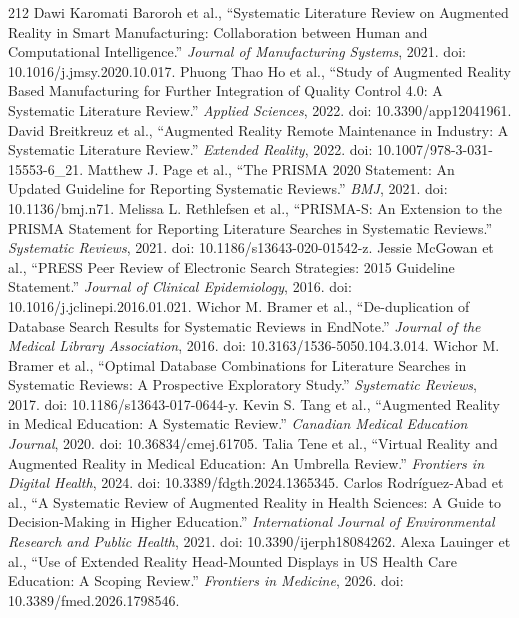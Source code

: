 \begin{thebibliography}{212}
 Dawi Karomati Baroroh et al., ``Systematic Literature Review on Augmented Reality in Smart Manufacturing: Collaboration between Human and Computational Intelligence.'' \emph{Journal of Manufacturing Systems}, 2021. doi: 10.1016/j.jmsy.2020.10.017.
 Phuong Thao Ho et al., ``Study of Augmented Reality Based Manufacturing for Further Integration of Quality Control 4.0: A Systematic Literature Review.'' \emph{Applied Sciences}, 2022. doi: 10.3390/app12041961.
 David Breitkreuz et al., ``Augmented Reality Remote Maintenance in Industry: A Systematic Literature Review.'' \emph{Extended Reality}, 2022. doi: 10.1007/978-3-031-15553-6_21.
 Matthew J. Page et al., ``The {PRISMA} 2020 Statement: An Updated Guideline for Reporting Systematic Reviews.'' \emph{BMJ}, 2021. doi: 10.1136/bmj.n71.
 Melissa L. Rethlefsen et al., ``{PRISMA-S}: An Extension to the {PRISMA} Statement for Reporting Literature Searches in Systematic Reviews.'' \emph{Systematic Reviews}, 2021. doi: 10.1186/s13643-020-01542-z.
 Jessie McGowan et al., ``{PRESS} Peer Review of Electronic Search Strategies: 2015 Guideline Statement.'' \emph{Journal of Clinical Epidemiology}, 2016. doi: 10.1016/j.jclinepi.2016.01.021.
 Wichor M. Bramer et al., ``De-duplication of Database Search Results for Systematic Reviews in {EndNote}.'' \emph{Journal of the Medical Library Association}, 2016. doi: 10.3163/1536-5050.104.3.014.
 Wichor M. Bramer et al., ``Optimal Database Combinations for Literature Searches in Systematic Reviews: A Prospective Exploratory Study.'' \emph{Systematic Reviews}, 2017. doi: 10.1186/s13643-017-0644-y.
 Kevin S. Tang et al., ``Augmented Reality in Medical Education: A Systematic Review.'' \emph{Canadian Medical Education Journal}, 2020. doi: 10.36834/cmej.61705.
 Talia Tene et al., ``Virtual Reality and Augmented Reality in Medical Education: An Umbrella Review.'' \emph{Frontiers in Digital Health}, 2024. doi: 10.3389/fdgth.2024.1365345.
 Carlos Rodr{\'i}guez-Abad et al., ``A Systematic Review of Augmented Reality in Health Sciences: A Guide to Decision-Making in Higher Education.'' \emph{International Journal of Environmental Research and Public Health}, 2021. doi: 10.3390/ijerph18084262.
 Alexa Lauinger et al., ``Use of Extended Reality Head-Mounted Displays in {US} Health Care Education: A Scoping Review.'' \emph{Frontiers in Medicine}, 2026. doi: 10.3389/fmed.2026.1798546.

\end{thebibliography}
